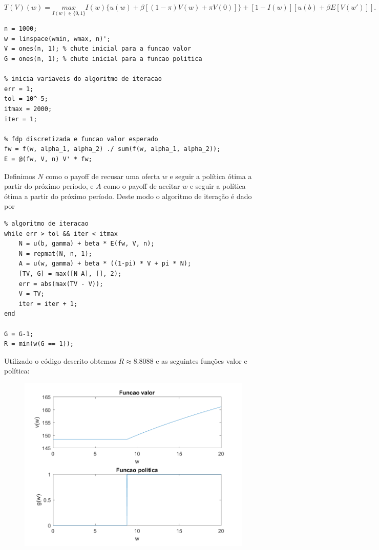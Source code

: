 \documentclass{article}
\begin{document}
$$T(V)(w) = \underset{I(w) \in \{0,1\}}{max} I(w) \{u(w) + \beta [(1-\pi) V(w) + \pi V(0)] \} + [1-I(w)] [u(b) + \beta E[V(w')]].$$

\newpage
\begin{lstlisting}
n = 1000;
w = linspace(wmin, wmax, n)';
V = ones(n, 1); % chute inicial para a funcao valor
G = ones(n, 1); % chute inicial para a funcao politica

% inicia variaveis do algoritmo de iteracao
err = 1;
tol = 10^-5;
itmax = 2000;
iter = 1;

% fdp discretizada e funcao valor esperado
fw = f(w, alpha_1, alpha_2) ./ sum(f(w, alpha_1, alpha_2));
E = @(fw, V, n) V' * fw; 
\end{lstlisting}

Definimos $N$ como o payoff de recusar uma oferta $w$ e seguir a política ótima a partir do próximo período, 
e $A$ como o payoff de aceitar $w$ e seguir a política ótima a partir do próximo período. 
Deste modo o algoritmo de iteração é dado por

\begin{lstlisting}
% algoritmo de iteracao
while err > tol && iter < itmax
    N = u(b, gamma) + beta * E(fw, V, n);
    N = repmat(N, n, 1);
    A = u(w, gamma) + beta * ((1-pi) * V + pi * N);
    [TV, G] = max([N A], [], 2);
    err = abs(max(TV - V));
    V = TV;
    iter = iter + 1;
end

G = G-1;
R = min(w(G == 1));
\end{lstlisting}

Utilizado o código descrito obtemos $R \approx 8.8088$ e as seguintes funções valor e política:

\begin{figure}[!h]
  \includegraphics[scale=0.6]{ex1/ex1_1.png}
\end{figure}
\end{document}
